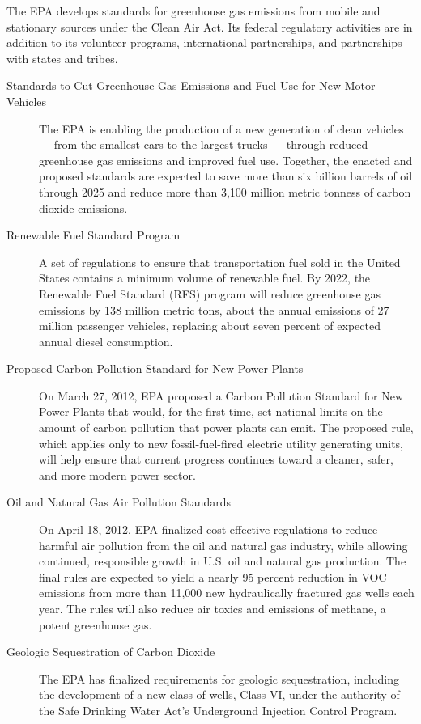 The EPA develops standards for greenhouse gas emissions from mobile and stationary sources under the Clean Air Act. Its federal regulatory activities are in addition to its volunteer programs, international partnerships, and partnerships with states and tribes.
\begin{description}
	\item [Standards to Cut Greenhouse Gas Emissions and Fuel Use for New Motor Vehicles] The EPA is enabling the production of a new generation of clean vehicles --- from the smallest cars to the largest trucks --- through reduced greenhouse gas emissions and improved fuel use. Together, the enacted and proposed standards are expected to save more than six billion barrels of oil through 2025 and reduce more than 3,100 million metric tonness of carbon dioxide emissions.
	\item [Renewable Fuel Standard Program] A set of regulations to ensure that transportation fuel sold in the United States contains a minimum volume of renewable fuel. By 2022, the Renewable Fuel Standard (RFS) program will reduce greenhouse gas emissions by 138 million metric tons, about the annual emissions of 27 million passenger vehicles, replacing about seven percent of expected annual diesel consumption.
	\item [Proposed Carbon Pollution Standard for New Power Plants] On March 27, 2012, EPA proposed a Carbon Pollution Standard for New Power Plants that would, for the first time, set national limits on the amount of carbon pollution that power plants can emit. The proposed rule, which applies only to new fossil-fuel-fired electric utility generating units, will help ensure that current progress continues toward a cleaner, safer, and more modern power sector.
	\item [Oil and Natural Gas Air Pollution Standards] On April 18, 2012, EPA finalized cost effective regulations to reduce harmful air pollution from the oil and natural gas industry, while allowing continued, responsible growth in U.S. oil and natural gas production. The final rules are expected to yield a nearly 95 percent reduction in VOC emissions from more than 11,000 new hydraulically fractured gas wells each year. The rules will also reduce air toxics and emissions of methane, a potent greenhouse gas.
	\item [Geologic Sequestration of Carbon Dioxide] The EPA has finalized requirements for geologic sequestration, including the development of a new class of wells, Class VI, under the authority of the Safe Drinking Water Act's Underground Injection Control Program. 
\end{description}



